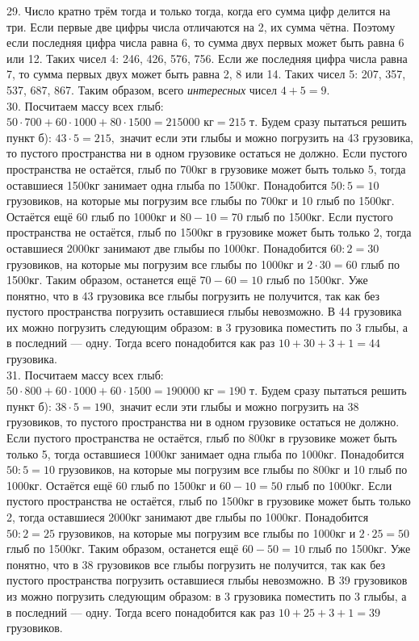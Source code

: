 29. Число кратно трём тогда и только тогда, когда его сумма цифр делится на три. Если первые две цифры числа отличаются на 2, их сумма чётна. Поэтому если последняя цифра числа равна 6, то сумма двух первых может быть равна 6 или 12. Таких чисел 4: 246, 426, 576, 756. Если же последняя цифра числа равна 7, то сумма первых двух может быть равна 2, 8 или 14. Таких чисел 5: 207, 357, 537, 687, 867. Таким образом, всего {\it интересных} чисел $4+5=9.$\\
30. Посчитаем массу всех глыб: $50\cdot700+60\cdot1000+80\cdot1500=215000\text{ кг}=215\text{ т}.$ Будем сразу пытаться решить пункт б): $43\cdot5=215,$ значит если эти глыбы и можно погрузить на 43 грузовика, то пустого пространства ни в одном грузовике остаться не должно. Если пустого пространства не остаётся, глыб по 700кг в грузовике может быть только 5, тогда оставшиеся 1500кг занимает одна глыба по 1500кг. Понадобится $50:5=10$ грузовиков, на которые мы погрузим все глыбы по 700кг и 10 глыб по 1500кг. Остаётся ещё 60 глыб по 1000кг и $80-10=70$ глыб по 1500кг. Если пустого пространства не остаётся, глыб по 1500кг в грузовике может быть только 2, тогда оставшиеся 2000кг занимают две глыбы по 1000кг. Понадобится $60:2=30$ грузовиков, на которые мы погрузим все глыбы по 1000кг и $2\cdot30=60$ глыб по 1500кг. Таким образом, останется ещё $70-60=10$ глыб по 1500кг. Уже понятно, что в 43 грузовика все глыбы погрузить не получится, так как без пустого пространства погрузить оставшиеся глыбы невозможно. В 44 грузовика их можно погрузить следующим образом: в 3 грузовика поместить по 3 глыбы, а в последний --- одну. Тогда всего понадобится как раз $10+30+3+1=44$ грузовика.\\
31. Посчитаем массу всех глыб: $50\cdot800+60\cdot1000+60\cdot1500=190000\text{ кг}=190\text{ т}.$ Будем сразу пытаться решить пункт б): $38\cdot5=190,$ значит если эти глыбы и можно погрузить на 38 грузовиков, то пустого пространства ни в одном грузовике остаться не должно. Если пустого пространства не остаётся, глыб по 800кг в грузовике может быть только 5, тогда оставшиеся 1000кг занимает одна глыба по 1000кг. Понадобится $50:5=10$ грузовиков, на которые мы погрузим все глыбы по 800кг и 10 глыб по 1000кг. Остаётся ещё 60 глыб по 1500кг и $60-10=50$ глыб по 1000кг. Если пустого пространства не остаётся, глыб по 1500кг в грузовике может быть только 2, тогда оставшиеся 2000кг занимают две глыбы по 1000кг. Понадобится $50:2=25$ грузовиков, на которые мы погрузим все глыбы по 1000кг и $2\cdot25=50$ глыб по 1500кг. Таким образом, останется ещё $60-50=10$ глыб по 1500кг. Уже понятно, что в 38 грузовиков все глыбы погрузить не получится, так как без пустого пространства погрузить оставшиеся глыбы невозможно. В 39 грузовиков из можно погрузить следующим образом: в 3 грузовика поместить по 3 глыбы, а в последний --- одну. Тогда всего понадобится как раз $10+25+3+1=39$ грузовиков.\\

